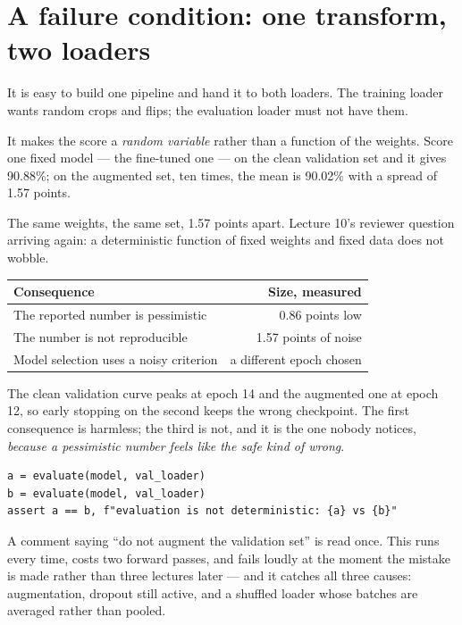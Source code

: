 \documentclass[11pt,a4paper]{article}
\begin{document}
\section{A failure condition: one transform, two loaders}

It is easy to build one pipeline and hand it to both loaders. The training
loader wants random crops and flips; the evaluation loader must not have them.

\begin{failbox}[title={Failure condition --- an augmented evaluation set is not a measurement}]
It makes the score a \emph{random variable} rather than a function of the
weights. Score one fixed model --- the fine-tuned one --- on the clean
validation set and it gives 90.88\%; on the augmented set, ten times, the mean
is 90.02\% with a spread of 1.57 points.

The same weights, the same set, 1.57 points apart. Lecture 10's reviewer
question arriving again: a deterministic function of fixed weights and fixed
data does not wobble.
\end{failbox}

\begin{center}
\small
\begin{tabular}{lr}
\toprule
\textbf{Consequence} & \textbf{Size, measured} \\
\midrule
The reported number is pessimistic & 0.86 points low \\
The number is not reproducible & 1.57 points of noise \\
Model selection uses a noisy criterion & a different epoch chosen \\
\bottomrule
\end{tabular}
\end{center}

The clean validation curve peaks at epoch 14 and the augmented one at epoch 12,
so early stopping on the second keeps the wrong checkpoint. The first
consequence is harmless; the third is not, and it is the one nobody notices,
\emph{because a pessimistic number feels like the safe kind of wrong}.

\begin{keybox}[title={The check, in two lines}]
\begin{verbatim}
a = evaluate(model, val_loader)
b = evaluate(model, val_loader)
assert a == b, f"evaluation is not deterministic: {a} vs {b}"
\end{verbatim}
A comment saying ``do not augment the validation set'' is read once. This runs
every time, costs two forward passes, and fails loudly at the moment the
mistake is made rather than three lectures later --- and it catches all three
causes: augmentation, dropout still active, and a shuffled loader whose batches
are averaged rather than pooled.
\end{keybox}
\end{document}
